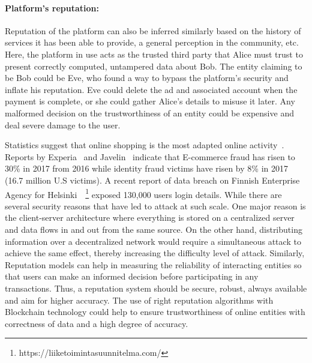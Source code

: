 \paragraph{Platform's reputation:}Reputation of the platform can also be
inferred similarly based on the history of services it has been able to
provide, a general perception in the community, etc.  Here, the platform in use
acts as the trusted third party that Alice must trust to present correctly
computed, untampered data about Bob. The entity claiming to be Bob could be
Eve, who found a way to bypass the platform's security and inflate his
reputation.  Eve could delete the ad and associated account when the payment is
complete, or she could gather Alice's details to misuse it later.  Any
malformed decision on the trustworthiness of an entity could be expensive and
deal severe damage to the user. \par 
Statistics suggest that online shopping is the most adapted online
activity~\cite{experian}. Reports by Experia~\cite{experian} and
Javelin~\cite{javelin} indicate that E-commerce fraud has risen to
30\% in 2017 from 2016 while identity fraud victims have risen by 8\% in 2017
(16.7 million U.S victims). 
A recent report of data breach on Finnish Enterprise Agency for
Helsinki~\cite{finland}~\footnote{https://liiketoimintasuunnitelma.com/}
exposed 130,000 users login details.
While there are several security reasons that have led to attack at such scale.
One major reason is the client-server architecture where everything is stored
on a centralized server and data flows in and out from the same source. On the
other hand, distributing information over a decentralized network would require
a simultaneous attack to achieve the same effect, thereby increasing the
difficulty level of attack. Similarly, Reputation models can help in measuring
the reliability of interacting entities so that users can make an informed
decision before participating in any transactions. Thus, a reputation system
should be secure, robust, always available and aim for higher accuracy. The use
of right reputation algorithms with Blockchain technology could help to ensure
trustworthiness of online entities with correctness of data and a high degree
of accuracy.  
